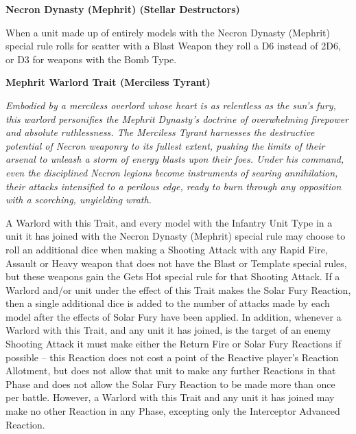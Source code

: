 \begin{multicols}{2}
	\textbf{Necron Dynasty (Mephrit) (Stellar Destructors)} 
	
	When a unit made up of entirely models with the Necron Dynasty (Mephrit) special rule rolls for scatter with a Blast Weapon they roll a D6 instead of 2D6, or D3 for weapons with the Bomb Type.
	
	\textbf{Mephrit Warlord Trait (Merciless Tyrant)}
	
	\textit{Embodied by a merciless overlord whose heart is as relentless as the sun's fury, this warlord personifies the Mephrit Dynasty’s doctrine of overwhelming firepower and absolute ruthlessness. The Merciless Tyrant harnesses the destructive potential of Necron weaponry to its fullest extent, pushing the limits of their arsenal to unleash a storm of energy blasts upon their foes. Under his command, even the disciplined Necron legions become instruments of searing annihilation, their attacks intensified to a perilous edge, ready to burn through any opposition with a scorching, unyielding wrath.}
	
	A Warlord with this Trait, and every model with the Infantry Unit Type in a unit it has joined with the Necron Dynasty (Mephrit) special rule may choose to roll an additional dice when making a Shooting Attack with any Rapid Fire, Assault or Heavy weapon that does not have the Blast or Template special rules, but these weapons gain the Gets Hot special rule for that Shooting Attack. If a Warlord and/or unit under the effect of this Trait makes the Solar Fury Reaction, then a single additional dice is added to the number of attacks made by each model after the effects of Solar Fury have been applied. In addition, whenever a Warlord with this Trait, and any unit it has joined, is the target of an enemy Shooting Attack it must make either the Return Fire or Solar Fury Reactions if possible – this Reaction does not cost a point of the Reactive player’s Reaction Allotment, but does not allow that unit to make any further Reactions in that Phase and does not allow the Solar Fury Reaction to be made more than once per battle. However, a Warlord with this Trait and any unit it has joined may make no other Reaction in any Phase, excepting only the Interceptor Advanced Reaction.
\end{multicols}


\newpage
\subsection[Nephrekh]{}

